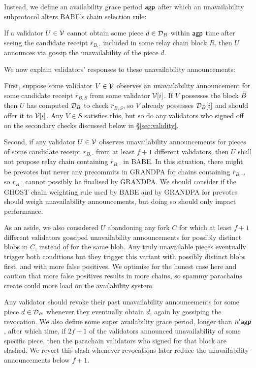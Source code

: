 Instead, we define an availability grace period $\mathsf{agp}$ after which an unavailability subprotocol alters BABE's chain selection rule:  

If a validator $U \in \mathcal{V}$ cannot obtain some piece $d \in \mathcal{D}_B$ within $\mathsf{agp}$ time after seeing the candidate receipt $\bar{r}_{B,\cdot}$ included in some relay chain block $R$, then $U$ announces via gossip the unavailability of the piece $d$. 

We now explain validators' responses to these unavailability announcements:

First, suppose some validator $V \in \mathcal{V}$ observes an unavailability announcement for some candidate receipt $\bar{r}_{B,S}$ from some validator $\mathcal{V}[i]$.  If $V$ possesses the block $\bar{B}$ then $U$ has computed $\mathcal{D}_B$ to check $\bar{r}_{B,S}$, so $V$ already possesses $\mathcal{D}_B[i]$ and should offer it to $\mathcal{V}[i]$.  Any $V \in S$ satisfies this, but so do any validators who signed off on the secondary checks discussed below in \S\ref{sec:validity}. 

Second, if any validator $U \in \mathcal{V}$ observes unavailability announcements for pieces of some candidate receipt $\bar{r}_{B,\cdot}$ from at least $f+1$ different validators, then $U$ shall not propose relay chain containing $\bar{r}_{B,\cdot}$ in BABE.
In this situation, there might be prevotes but never any precommits in GRANDPA for chains containing  $\bar{r}_{B,\cdot}$, so $\bar{r}_{B,\cdot}$ cannot possibly be finalised by GRANDPA.  We should consider if the GHOST chain weighting rule used by BABE and by GRANDPA for prevotes should weigh unavailability announcements, but doing so should only impact performance.

As an aside, we also considered $U$ abandoning any fork $C$ for which at least $f+1$ different validators gossiped unavailability announcements for possibly distinct blobs in $C$, instead of for the same blob.  Any truly unavailable pieces eventually trigger both conditions but they trigger this variant with possibly distinct blobs first, and with more false positives.  We optimise for the honest case here and caution that more false positives results in more chains, so spammy parachains create could more load on the availability system.

Any validator should revoke their past unavailability announcements for some piece $d \in \mathcal{D}_B$ whenever they eventually obtain $d$, again by gossiping the revocation.  We also define some super availability grace period, longer than $n' \mathsf{agp}$, after which time, if $2 f + 1$ of the validators announced unavailability of some specific piece, then the parachain validators who signed for that block are slashed.
We revert this slash whenever revocations later reduce the unavailability announcements below $f+1$.










